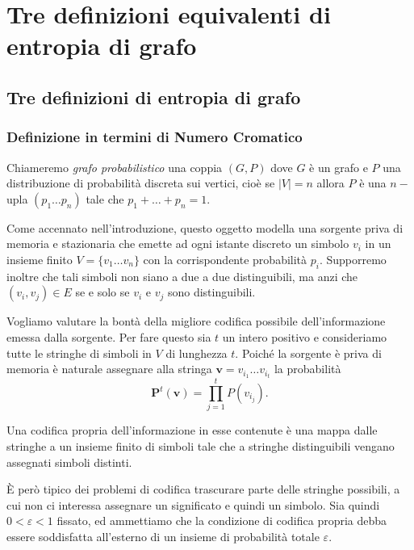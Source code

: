 \chapter{Tre definizioni equivalenti di entropia di grafo} 
\section{Tre definizioni di entropia di grafo} 
\subsection{Definizione in termini di Numero Cromatico} \label{codinganalogy} 
\begin{definition}
	Chiameremo \emph{grafo probabilistico} una coppia \((G,P)\) dove \(G\) è un grafo e \(P\) una distribuzione di probabilità discreta sui vertici, cioè se \(|V|=n\) allora \(P\) è una \(n-\)upla \((p_1 \dots p_n)\) tale che \(p_1 + \dots + p_n = 1\). 
\end{definition}

Come accennato nell'introduzione, questo oggetto modella una sorgente priva di memoria e stazionaria che emette ad ogni istante discreto un simbolo \(v_i\) in un insieme finito \(V=\{v_1 \dots v_n\}\) con la corrispondente probabilità \(p_i\). Supporremo inoltre che tali simboli non siano a due a due distinguibili, ma anzi che \((v_i, v_j) \in E\) se e solo se \(v_i\) e \(v_j\) sono distinguibili.

Vogliamo valutare la bontà della migliore codifica possibile dell'informazione emessa dalla sorgente. Per fare questo sia \(t\) un intero positivo e consideriamo tutte le stringhe di simboli in \(V\) di lunghezza \(t\). Poiché la sorgente è priva di memoria è naturale assegnare alla stringa \(\mathbf{v} = v_{i_1}\dots v_{i_t}\) la probabilità 
\begin{equation}
	\label{eq:probability}\mathbf{P}^t(\mathbf{v})=\prod_{j=1}^t P(v_{i_j}). 
\end{equation}

Una codifica propria dell'informazione in esse contenute è una mappa dalle stringhe a un insieme finito di simboli tale che a stringhe distinguibili vengano assegnati simboli distinti.

È però tipico dei problemi di codifica trascurare parte delle stringhe possibili, a cui non ci interessa assegnare un significato e quindi un simbolo. Sia quindi \(0<\varepsilon <1\) fissato, ed ammettiamo che la condizione di codifica propria debba essere soddisfatta all'esterno di un insieme di probabilità totale \(\varepsilon\).

